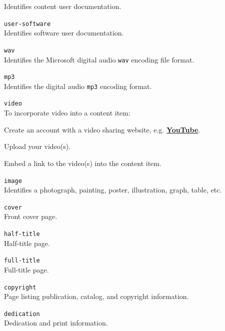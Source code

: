 \documentclass[12pt]{article}
\begin{document}
\begin{description}
\begin{description}
	Identifies content user documentation.
	\item {\tt user-software}\\
	Identifies software user documentation.
  	\item{\tt wav}\\
	Identifies the Microsoft digital audio {\tt \small wav} encoding file format.
  	 \item{\tt mp3}\\
	 Identifies the digital audio {\tt \small mp3} encoding format.
	\item {\tt video}\\
	To incorporate video into a content item:
		\begin{description}
		\item Create an account with a video sharing website, e.g. \href{http://www.youtube.com/watch?v=1n8DxTk2gVM}{\bf YouTube}.
   		\item Upload your video(s).
  		\item Embed a link to the video(s) into the content item.
		\end{description}
	\item {\tt image}\\
	Identifies a photograph, painting, poster, illustration, graph, table, etc.
	\item {\tt cover}\\
	Front cover page.
	\item {\tt half-title}\\
	Half-title page.
	\item {\tt full-title}\\
	Full-title page.
	\item {\tt copyright}\\
	Page listing publication, catalog, and copyright information.
	\item {\tt dedication}\\
	Dedication and print information.

\end{description}
\end{description}
\end{document}
